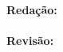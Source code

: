 \begin{adjustwidth}{0pt}{0.2\textwidth}
	\begin{flushleft}
		\proposta\\
		\bigskip
		\textbf{Redação:}\\
		\equipaRedatora\\
		\bigskip
		\textbf{Revisão:}\\
		\equipaRevisora
	\end{flushleft}
\end{adjustwidth}